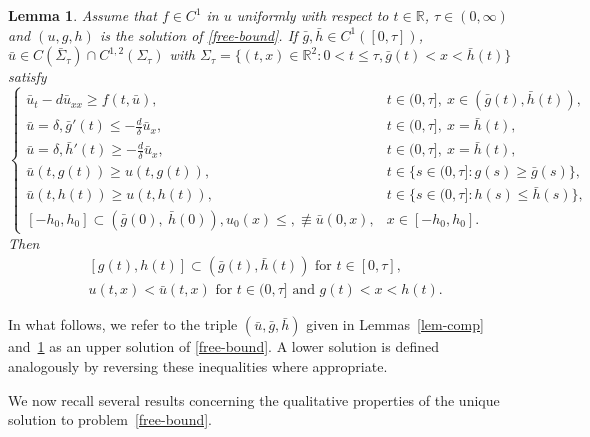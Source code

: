 \documentclass[11pt]{amsart}
\newtheorem{lemma}[theorem]{Lemma}
\numberwithin{equation}{section}
\begin{document}
 \begin{lemma}{\rm\cite[Lemma 2.3]{MDW}}\label{lem-comp2}
  Assume that $f\in C^1$ in $u$ uniformly with respect to $t\in \mathbb R$, $\tau\in(0,\infty)$ and $(u,g,h)$ is the solution of \eqref{free-bound}.  If $\bar{g},\bar{h}\in C^1([0,\tau])$, $\bar{u}\in C(\bar{\Sigma}_\tau)\cap C^{1,2}( \Sigma_\tau)$ with $\Sigma_\tau=\{(t,x)\in\mathbb{R}^2:0<t\leq \tau,\bar{g}(t)< x<\bar{h}(t)\}$ satisfy
 \begin{equation*}
   \begin{cases}
     \bar{u}_t-d\bar{u}_{xx}\geq f(t,\bar{u}), &t\in (0,\tau],\ x\in (\bar{g}(t), \bar{h}(t)),\\
     \bar{u}=\delta, \bar{g}'(t)\leq -\frac{d}{\delta}\bar{u}_x,&t\in (0, \tau],\ x=\bar{h}(t),\\
    \bar{u}=\delta, \bar{h}'(t)\geq -\frac{d}{\delta}\bar{u}_x,&t\in (0, \tau], \ x=\bar{h}(t),\\
    \bar{u}(t,g(t))\geq u(t,g(t)), & t\in\{s\in (0, \tau]:  g(s)\geq \bar{g}(s)\},\\
    \bar{u}(t,h(t))\geq u(t,h(t)), & t\in \{s\in (0, \tau]:  h(s)\leq \bar{h}(s)\},\\
    [-h_0,h_0]\subset (\bar{g}(0),\ \bar{h}(0)),u_0(x)\leq,\not\equiv  \bar{u}(0,x),&x\in[-h_0,h_0].
   \end{cases}
 \end{equation*}
 Then
 \begin{align*}
   &[g(t),h(t)]\subset (\bar{g}(t),\bar{h}(t))\text{ for  }t\in[0,\tau],\\
   &u(t,x)< \bar{u}(t,x)\text{ for }t\in(0,\tau] \text{ and }g(t)<x<h(t).
 \end{align*}
 \end{lemma}

 In what follows, we refer to the triple \( (\bar{u}, \bar{g}, \bar{h}) \) given in Lemmas~\ref{lem-comp} and~\ref{lem-comp2} as an upper solution of \eqref{free-bound}. 
A lower solution is defined analogously by reversing these inequalities where appropriate.

We now recall several results concerning the qualitative properties of the unique solution to problem~\eqref{free-bound}.
\end{document}
